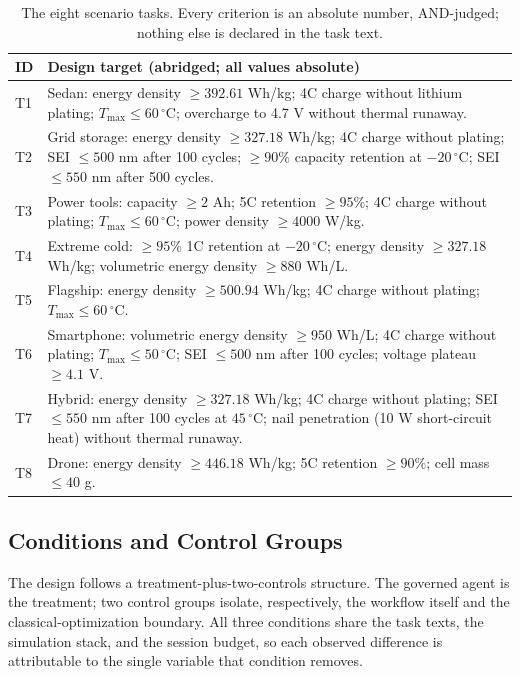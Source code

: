 \begin{table}[!ht]
\centering
\caption{The eight scenario tasks. Every criterion is an absolute number,
AND-judged; nothing else is declared in the task text.}
\label{tab:tasks}
\setlength{\tabcolsep}{2.5pt}
\begin{tabular}{p{1.0cm}p{10.5cm}}
\toprule
ID & Design target (abridged; all values absolute) \\
\midrule
T1 & Sedan: energy density $\geq 392.61$ Wh/kg; 4C charge without lithium
plating; $T_{\max}\leq 60\,^\circ$C; overcharge to 4.7 V without thermal
runaway. \\
T2 & Grid storage: energy density $\geq 327.18$ Wh/kg; 4C charge without
plating; SEI $\leq 500$ nm after 100 cycles; $\geq 90\%$ capacity retention
at $-20\,^\circ$C; SEI $\leq 550$ nm after 500 cycles. \\
T3 & Power tools: capacity $\geq 2$ Ah; 5C retention $\geq 95\%$; 4C charge
without plating; $T_{\max}\leq 60\,^\circ$C; power density $\geq 4000$
W/kg. \\
T4 & Extreme cold: $\geq 95\%$ 1C retention at $-20\,^\circ$C; energy
density $\geq 327.18$ Wh/kg; volumetric energy density $\geq 880$ Wh/L. \\
T5 & Flagship: energy density $\geq 500.94$ Wh/kg; 4C charge without
plating; $T_{\max}\leq 60\,^\circ$C. \\
T6 & Smartphone: volumetric energy density $\geq 950$ Wh/L; 4C charge
without plating; $T_{\max}\leq 50\,^\circ$C; SEI $\leq 500$ nm after 100
cycles; voltage plateau $\geq 4.1$ V. \\
T7 & Hybrid: energy density $\geq 327.18$ Wh/kg; 4C charge without plating;
SEI $\leq 550$ nm after 100 cycles at $45\,^\circ$C; nail penetration
(10 W short-circuit heat) without thermal runaway. \\
T8 & Drone: energy density $\geq 446.18$ Wh/kg; 5C retention $\geq 90\%$;
cell mass $\leq 40$ g. \\
\bottomrule
\end{tabular}
\end{table}

\subsection{Conditions and Control Groups}

The design follows a treatment-plus-two-controls structure. The governed
agent is the treatment; two control groups isolate, respectively, the
workflow itself and the classical-optimization boundary. All three
conditions share the task texts, the simulation stack, and the session
budget, so each observed difference is attributable to the single variable
that condition removes.


